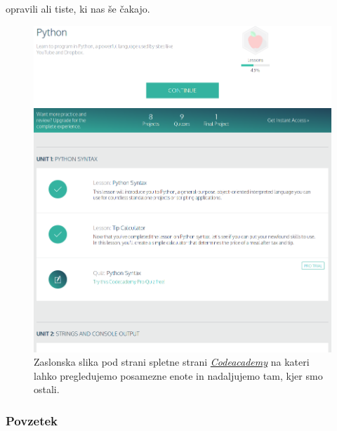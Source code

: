 opravili ali tiste, ki nas še čakajo.

\begin{figure}[h!]
  \centering
    \includegraphics [width=0.65\linewidth, keepaspectratio =
    1] {./images/sc_web/codeacademy_tema_01.png}
    \caption{Zaslonska slika pod strani spletne strani
      \emph{\href{https://www.codecademy.com/}{Codeacademy}}
      \cite{web:codeacademy} na kateri lahko pregledujemo posamezne
      enote in nadaljujemo tam, kjer smo ostali.}
    \label{fig:scr:web:codeacademy:tema}
\end{figure}



\subsubsection{Povzetek}

